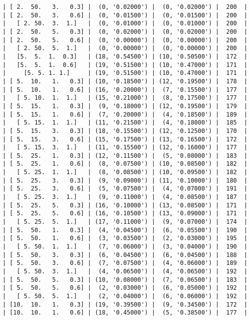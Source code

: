 \documentclass{article}
\begin{document}
\begin{verbatim}
| [ 2.  50.   3.   0.3] |  (0, '0.02000') |  (0, '0.02000') |  200  |
| [ 2.  50.   3.   0.6] |  (0, '0.01500') |  (0, '0.01500') |  200  |
|   [ 2. 50.  3.  1.]   |  (0, '0.01000') |  (0, '0.01000') |  200  |
| [ 2.  50.   5.   0.3] |  (0, '0.02000') |  (0, '0.02000') |  200  |
| [ 2.  50.   5.   0.6] |  (0, '0.00000') |  (0, '0.00000') |  200  |
|   [ 2. 50.  5.  1.]   |  (0, '0.00000') |  (0, '0.00000') |  200  |
|   [5.  5.  1.  0.3]   | (18, '0.54500') | (10, '0.50500') |  172  |
|   [5.  5.  1.  0.6]   | (19, '0.51500') | (10, '0.47000') |  171  |
|     [5. 5. 1. 1.]     | (19, '0.51500') | (10, '0.47000') |  171  |
| [ 5.  10.   1.   0.3] | (10, '0.18500') | (12, '0.19500') |  178  |
| [ 5.  10.   1.   0.6] | (16, '0.20000') |  (7, '0.15500') |  177  |
|   [ 5. 10.  1.  1.]   | (15, '0.21000') |  (8, '0.17500') |  177  |
| [ 5.  15.   1.   0.3] |  (9, '0.18000') | (12, '0.19500') |  179  |
| [ 5.  15.   1.   0.6] |  (7, '0.20000') |  (4, '0.18500') |  189  |
|   [ 5. 15.  1.  1.]   | (11, '0.21500') |  (4, '0.18000') |  185  |
| [ 5.  15.   3.   0.3] | (18, '0.15500') | (12, '0.12500') |  170  |
| [ 5.  15.   3.   0.6] | (15, '0.17500') | (13, '0.16500') |  172  |
|   [ 5. 15.  3.  1.]   | (11, '0.15500') | (12, '0.16000') |  177  |
| [ 5.  25.   1.   0.3] | (12, '0.11500') |  (5, '0.08000') |  183  |
| [ 5.  25.   1.   0.6] |  (8, '0.07500') | (10, '0.08500') |  182  |
|   [ 5. 25.  1.  1.]   |  (8, '0.08500') | (10, '0.09500') |  182  |
| [ 5.  25.   3.   0.3] |  (9, '0.09000') | (11, '0.10000') |  180  |
| [ 5.  25.   3.   0.6] |  (5, '0.07500') |  (4, '0.07000') |  191  |
|   [ 5. 25.  3.  1.]   |  (9, '0.11000') |  (4, '0.08500') |  187  |
| [ 5.  25.   5.   0.3] | (16, '0.10000') | (13, '0.08500') |  171  |
| [ 5.  25.   5.   0.6] | (16, '0.10500') | (13, '0.09000') |  171  |
|   [ 5. 25.  5.  1.]   | (17, '0.11000') |  (9, '0.07000') |  174  |
| [ 5.  50.   1.   0.3] |  (4, '0.04500') |  (6, '0.05500') |  190  |
| [ 5.  50.   1.   0.6] |  (3, '0.03500') |  (2, '0.03000') |  195  |
|   [ 5. 50.  1.  1.]   |  (7, '0.06000') |  (3, '0.04000') |  190  |
| [ 5.  50.   3.   0.3] |  (6, '0.04500') |  (6, '0.04500') |  188  |
| [ 5.  50.   3.   0.6] |  (7, '0.07500') |  (4, '0.06000') |  189  |
|   [ 5. 50.  3.  1.]   |  (4, '0.06500') |  (4, '0.06500') |  192  |
| [ 5.  50.   5.   0.3] | (10, '0.08000') |  (7, '0.06500') |  183  |
| [ 5.  50.   5.   0.6] |  (2, '0.03000') |  (6, '0.05000') |  192  |
|   [ 5. 50.  5.  1.]   |  (2, '0.04000') |  (6, '0.06000') |  192  |
| [10.  10.   1.   0.3] | (19, '0.39500') |  (9, '0.34500') |  172  |
| [10.  10.   1.   0.6] | (18, '0.45000') |  (5, '0.38500') |  177  |

\end{verbatim}
\end{document}
